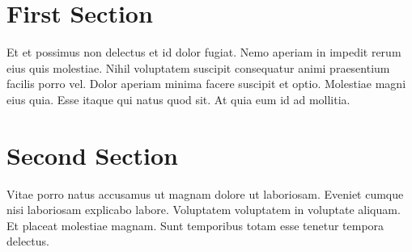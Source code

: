 \documentclass{scrbook}
\begin{document}
    \section{First Section}
        Et et possimus non delectus et id dolor fugiat. Nemo aperiam in
         impedit rerum eius quis molestiae.
        Nihil voluptatem suscipit consequatur animi praesentium facilis
        porro vel. 
        Dolor aperiam minima facere suscipit et optio.
        Molestiae magni eius quia. Esse itaque qui natus quod sit. At
        quia eum id ad mollitia.
    \section{Second Section}
        Vitae porro natus accusamus ut magnam dolore ut laboriosam. Eveniet cumque nisi laboriosam explicabo labore. Voluptatem voluptatem in voluptate aliquam. Et placeat molestiae magnam. Sunt temporibus totam esse tenetur tempora delectus.
\end{document}
